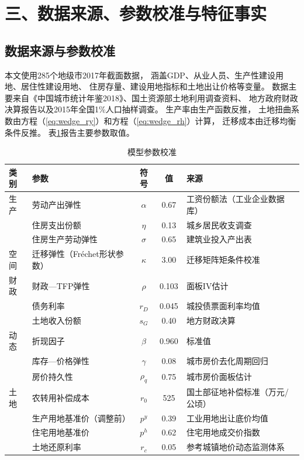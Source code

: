 \documentclass[UTF8,a4paper,12pt]{ctexart}
\theoremstyle{plain}
\theoremstyle{definition}
\theoremstyle{remark}
\begin{document}
\section{三、数据来源、参数校准与特征事实}

\subsection{数据来源与参数校准}

本文使用285个地级市2017年截面数据，
涵盖GDP、从业人员、生产性建设用地、居住性建设用地、
住房存量、建设用地指标和土地出让价格等变量。
数据主要来自《中国城市统计年鉴2018》、国土资源部土地利用调查资料、
地方政府财政决算报告以及2015年全国1\%人口抽样调查。
生产率由生产函数反推，
土地扭曲系数由方程（\ref{eq:wedge_ry}）和方程（\ref{eq:wedge_rh}）计算，
迁移成本由迁移均衡条件反推。
表\ref{tab:params}报告主要参数取值。

\begin{table}[htbp]
  \centering
  \caption{模型参数校准}
  \label{tab:params}
  \begin{tabular}{llccl}
    \toprule
    类别 & 参数 & 符号 & 值 & 来源 \\
    \midrule
    生产 & 劳动产出弹性      & $\alpha$    & 0.67  & 工资份额法（工业企业数据库） \\
         & 住房支出份额      & $\eta$      & 0.13  & 城乡居民收支调查 \\
         & 住房生产劳动弹性  & $\sigma$    & 0.65  & 建筑业投入产出表 \\
    \midrule
    空间 & 迁移弹性（Fréchet形状参数）& $\kappa$    & 3.00  & 迁移矩阵矩条件校准 \\
    \midrule
    财政 & 财政—TFP弹性      & $\rho$      & 0.103 & 面板IV估计 \\
         & 债务利率          & $r_D$       & 0.045 & 城投债票面利率均值 \\
         & 土地收入份额      & $s_G$       & 0.40  & 地方财政决算 \\
    \midrule
    动态 & 折现因子          & $\beta$     & 0.960 & 标准值 \\
         & 库存—价格弹性    & $\gamma$    & 0.08  & 城市房价去化周期回归 \\
         & 房价持久性        & $\rho_q$    & 0.75  & 城市房价面板估计 \\
    \midrule
    土地 & 农转用补偿成本    & $r_0$       & 525   & 国土部征地补偿标准（万元/公顷） \\
         & 生产用地基准价（调整前）& $p^y$  & 0.39  & 工业用地出让底价均值 \\
         & 住宅用地基准价    & $p^h$       & 0.62  & 住宅用地成交价指数 \\
         & 土地还原利率      & $r_c$       & 0.05  & 参考城镇地价动态监测体系 \\
    \bottomrule
  \end{tabular}
\end{table}
\end{document}
